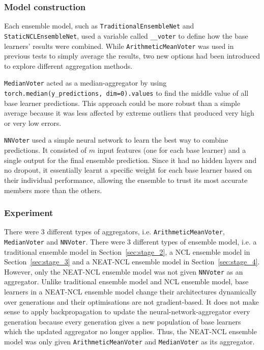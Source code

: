 \documentclass{article}
\begin{document}
\subsubsection{Model construction}
Each ensemble model, such as \texttt{TraditionalEnsembleNet} and \texttt{StaticNCLEnsembleNet}, used a variable called \texttt{\_\_voter} to define how the base learners' results were combined. While \texttt{ArithmeticMeanVoter} was used in previous tests to simply average the results, two new options had been introduced to explore different aggregation methods. 

\texttt{MedianVoter} acted as a median-aggregator by using \texttt{torch.median(y\_predictions, dim=0).values} to find the middle value of all base learner predictions. This approach could be more robust than a simple average because it was less affected by extreme outliers that produced very high or very low errors. 

\texttt{NNVoter} used a simple neural network to learn the best way to combine predictions. It consisted of $m$ input features (one for each base learner) and a single output for the final ensemble prediction. Since it had no hidden layers and no dropout, it essentially learnt a specific weight for each base learner based on their individual performance, allowing the ensemble to trust its most accurate members more than the others. 


\subsubsection{Experiment}
There were 3 different types of aggregators, i.e. \texttt{ArithmeticMeanVoter}, \texttt{MedianVoter} and \texttt{NNVoter}. There were 3 different types of ensemble model, i.e. a traditional ensemble model in Section~\ref{sec:stage_2}, a NCL ensemble model in Section~\ref{sec:stage_3} and a NEAT-NCL ensemble model in Section~\ref{sec:stage_4}. However, only the NEAT-NCL ensemble model was not given \texttt{NNVoter} as an aggregator. Unlike traditional ensemble model and NCL ensemble model, base learners in a NEAT-NCL ensemble model change their architectures dynamically over generations and their optimisations are not gradient-based. It does not make sense to apply backpropagation to update the neural-network-aggregator every generation because every generation gives a new population of base learners which the updated aggregator no longer applies. Thus, the NEAT-NCL ensemble model was only given \texttt{ArithmeticMeanVoter} and \texttt{MedianVoter} as its aggregator. 
\end{document}
